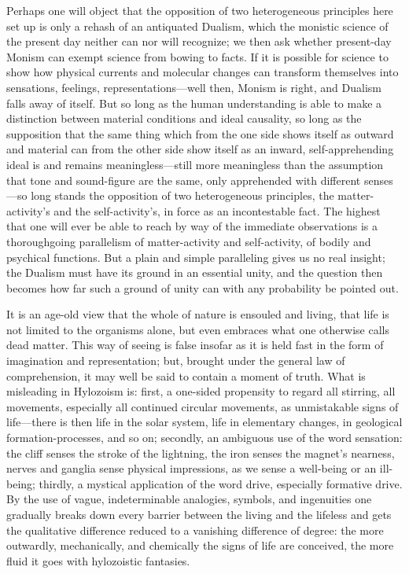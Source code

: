 \documentclass[12pt]{article}
\begin{document}
Perhaps one will object that the opposition of two heterogeneous principles
here set up is only a rehash of an antiquated Dualism, which the monistic
science of the present day neither can nor will recognize; we then ask
whether present-day Monism can exempt science from bowing to facts. If it is
possible for science to show how physical currents and molecular changes can
transform themselves into sensations, feelings, representations—well then,
Monism is right, and Dualism falls away of itself. But so long as the human
understanding is able to make a distinction between material conditions and
ideal causality, so long as the supposition that the same thing which from
the one side shows itself as outward and material can from the other side
show itself as an inward, self-apprehending ideal is and remains
meaningless—still more meaningless than the assumption that tone and
sound-figure are the same, only apprehended with different senses—so long
stands the opposition of two heterogeneous principles, the matter-activity's
and the self-activity's, in force as an incontestable fact. The highest that
one will ever be able to reach by way of the immediate observations is a
thoroughgoing parallelism of matter-activity and self-activity, of bodily
and psychical functions. But a plain and simple paralleling gives us no real
insight; the Dualism must have its ground in an essential unity, and the
question then becomes how far such a ground of unity can with any
probability be pointed out.

It is an age-old view that the whole of nature is ensouled and living, that
life is not limited to the organisms alone, but even embraces what one
otherwise calls dead matter. This way of seeing is false insofar as it is
held fast in the form of imagination and representation; but, brought under
the general law of comprehension, it may well be said to contain a moment of
truth. What is misleading in Hylozoism is: first, a one-sided propensity to
regard all stirring, all movements, especially all continued circular
movements, as unmistakable signs of life—there is then life in the solar
system, life in elementary changes, in geological formation-processes, and
so on; secondly, an ambiguous use of the word sensation: the cliff senses
the stroke of the lightning, the iron senses the magnet's nearness, nerves
and ganglia sense physical impressions, as we sense a well-being or an
ill-being; thirdly, a mystical application of the word drive, especially
formative drive. By the use of vague, indeterminable analogies, symbols, and
ingenuities one gradually breaks down every barrier between the living and
the lifeless and gets the qualitative difference reduced to a vanishing
difference of degree: the more outwardly, mechanically, and chemically the
signs of life are conceived, the more fluid it goes with hylozoistic
fantasies.
\end{document}
